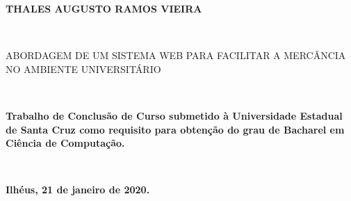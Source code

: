 
%
% 
%
\begin{folhadeaprovacao}


\begin{center}

    {\large \begin{large} \bfseries THALES AUGUSTO RAMOS VIEIRA \end{large}\\}
    \vspace{4cm}
    {\large\bfseries{\begin{large}ABORDAGEM DE UM SISTEMA WEB PARA FACILITAR A MERCÂNCIA NO AMBIENTE UNIVERSITÁRIO \end{large}}\\}
    \vspace{1cm}
    \hspace{.45\linewidth}
    \begin{minipage}{.50\linewidth}

            \textbf{Trabalho de Conclusão de Curso submetido à Universidade Estadual de Santa Cruz  como requisito para obtenção do grau de Bacharel em Ciência de Computação. }
    \end{minipage}
    \\
\end{center}
    \textbf{Ilhéus, 21 de janeiro de 2020.}
\begin{center}
           

    \bfseries{}
\end{center}


    \vspace{2.5cm}
    \vspace{3 cm}%

  
\end{folhadeaprovacao}